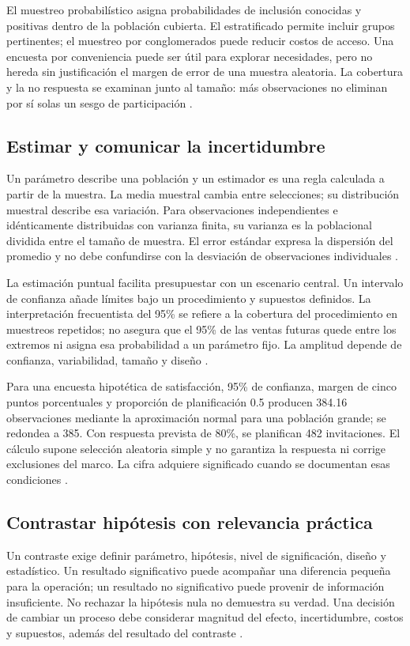 \documentclass[
	spanish,
	letterpaper, oneside
]{article}
\begin{document}
El muestreo probabilístico asigna probabilidades de inclusión conocidas y positivas dentro de la población cubierta. El estratificado permite incluir grupos pertinentes; el muestreo por conglomerados puede reducir costos de acceso. Una encuesta por conveniencia puede ser útil para explorar necesidades, pero no hereda sin justificación el margen de error de una muestra aleatoria. La cobertura y la no respuesta se examinan junto al tamaño: más observaciones no eliminan por sí solas un sesgo de participación \citep{bradley2021}.

\subsection{Estimar y comunicar la incertidumbre}
Un parámetro describe una población y un estimador es una regla calculada a partir de la muestra. La media muestral cambia entre selecciones; su distribución muestral describe esa variación. Para observaciones independientes e idénticamente distribuidas con varianza finita, su varianza es la poblacional dividida entre el tamaño de muestra. El error estándar expresa la dispersión del promedio y no debe confundirse con la desviación de observaciones individuales \citep{wackerly2010}.

La estimación puntual facilita presupuestar con un escenario central. Un intervalo de confianza añade límites bajo un procedimiento y supuestos definidos. La interpretación frecuentista del 95\% se refiere a la cobertura del procedimiento en muestreos repetidos; no asegura que el 95\% de las ventas futuras quede entre los extremos ni asigna esa probabilidad a un parámetro fijo. La amplitud depende de confianza, variabilidad, tamaño y diseño \citep{nistHandbook}.

Para una encuesta hipotética de satisfacción, 95\% de confianza, margen de cinco puntos porcentuales y proporción de planificación 0.5 producen 384.16 observaciones mediante la aproximación normal para una población grande; se redondea a 385. Con respuesta prevista de 80\%, se planifican 482 invitaciones. El cálculo supone selección aleatoria simple y no garantiza la respuesta ni corrige exclusiones del marco. La cifra adquiere significado cuando se documentan esas condiciones \citep{holmesBusiness2023}.

\subsection{Contrastar hipótesis con relevancia práctica}
Un contraste exige definir parámetro, hipótesis, nivel de significación, diseño y estadístico. Un resultado significativo puede acompañar una diferencia pequeña para la operación; un resultado no significativo puede provenir de información insuficiente. No rechazar la hipótesis nula no demuestra su verdad. Una decisión de cambiar un proceso debe considerar magnitud del efecto, incertidumbre, costos y supuestos, además del resultado del contraste \citep{nistHandbook}.
\end{document}
